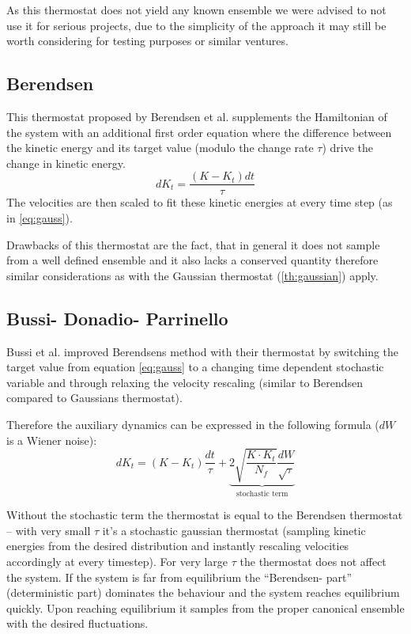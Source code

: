 As this thermostat does not yield any known ensemble we were advised to not use it for serious projects, due to the simplicity of the approach it may still be worth considering for testing purposes or similar ventures.



\subsection{Berendsen}
This thermostat proposed by Berendsen et al. \cite{Berendsen1984} supplements the Hamiltonian of the system with an additional first order equation where the difference between the kinetic energy and its target value (modulo the change rate $\tau$) drive the change in kinetic energy.
\begin{equation}
{dK_t} = \frac{(K-K_t)dt}{\tau} \label{eq:berendsen}%
\end{equation}
The velocities are then scaled to fit these kinetic energies at every time step (as in \eqref{eq:gauss}).

Drawbacks of this thermostat are the fact, that in general it does not sample from a well defined ensemble \cite{Morishita2000} and it also lacks a conserved quantity \cite{Bussi2007}
therefore similar considerations as with the Gaussian thermostat (\ref{th:gaussian}) apply.
\subsection{Bussi- Donadio- Parrinello}
Bussi et al.\cite{Bussi2007} improved Berendsens method with their thermostat by switching the target value from equation \eqref{eq:gauss} to a changing time dependent stochastic variable and through relaxing the velocity rescaling (similar to Berendsen compared to Gaussians thermostat).

Therefore the auxiliary dynamics can be expressed in the following formula ($dW$ is a Wiener noise):
\begin{equation}
dK_t = (K- K_t) \frac{dt}{\tau} + \underbrace{2\sqrt{\frac{K\cdot K_t}{N_f}}\frac{dW}{\sqrt{\tau}}}_{\text{stochastic term}}
\end{equation}

Without the stochastic term the thermostat is equal to the Berendsen thermostat -- with very small $\tau$ it's a stochastic gaussian thermostat (sampling kinetic energies from the desired distribution and instantly rescaling velocities accordingly at every timestep). For very large $\tau$ the thermostat does not affect the system. If the system is far from equilibrium the ``Berendsen- part'' (deterministic part) dominates the behaviour and the system reaches equilibrium quickly. Upon reaching equilibrium it samples from the proper canonical ensemble with the desired fluctuations.


